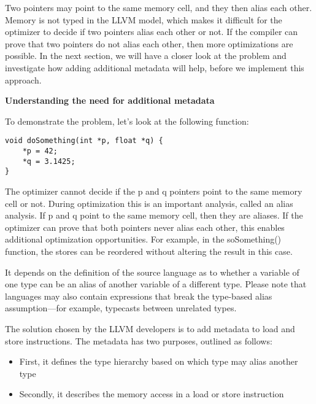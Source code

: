 Two pointers may point to the same memory cell, and they then alias each other. Memory is not typed in the LLVM model, which makes it difficult for the optimizer to decide if two pointers alias each other or not. If the compiler can prove that two pointers do not alias each other, then more optimizations are possible. In the next section, we will have a closer look at the problem and investigate how adding additional metadata will help, before we implement this approach.\par

\hspace*{\fill} \par %
\textbf{Understanding the need for additional metadata}

To demonstrate the problem, let's look at the following function:\par

\begin{lstlisting}[caption={}]
void doSomething(int *p, float *q) {
	*p = 42;
	*q = 3.1425;
}
\end{lstlisting}

The optimizer cannot decide if the p and q pointers point to the same memory cell or not. During optimization this is an important analysis, called an alias analysis. If p and q point to the same memory cell, then they are aliases. If the optimizer can prove that both pointers never alias each other, this enables additional optimization opportunities. For example, in the soSomething() function, the stores can be reordered without altering the result in this case.\par

It depends on the definition of the source language as to whether a variable of one type can be an alias of another variable of a different type. Please note that languages may also contain expressions that break the type-based alias assumption—for example, typecasts between unrelated types.\par

The solution chosen by the LLVM developers is to add metadata to load and store instructions. The metadata has two purposes, outlined as follows:\par

\begin{itemize}
	\item First, it defines the type hierarchy based on which type may alias another type
	\item Secondly, it describes the memory access in a load or store instruction
\end{itemize}

